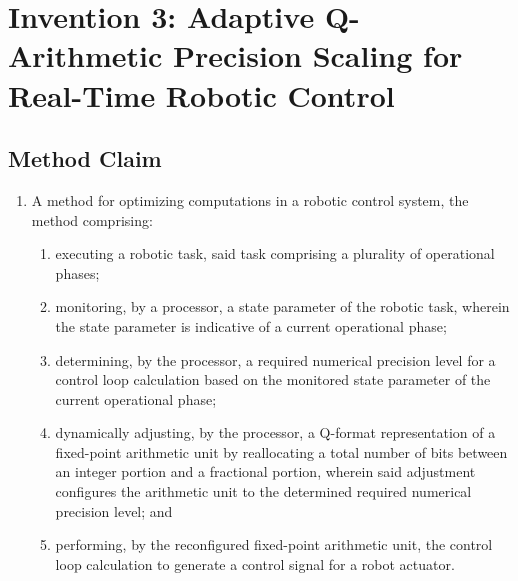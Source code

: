 \documentclass{article}
\begin{document}
\newpage

\section{Invention 3: Adaptive Q-Arithmetic Precision Scaling for Real-Time Robotic Control}

\subsection{Method Claim}
\begin{enumerate}[label=1.]
    \item A method for optimizing computations in a robotic control system, the method comprising:
    \begin{enumerate}[label=(\alph*)]
        \item executing a robotic task, said task comprising a plurality of operational phases;
        \item monitoring, by a processor, a state parameter of the robotic task, wherein the state parameter is indicative of a current operational phase;
        \item determining, by the processor, a required numerical precision level for a control loop calculation based on the monitored state parameter of the current operational phase;
        \item dynamically adjusting, by the processor, a Q-format representation of a fixed-point arithmetic unit by reallocating a total number of bits between an integer portion and a fractional portion, wherein said adjustment configures the arithmetic unit to the determined required numerical precision level; and
        \item performing, by the reconfigured fixed-point arithmetic unit, the control loop calculation to generate a control signal for a robot actuator.
    \end{enumerate}
\end{enumerate}
\end{document}
